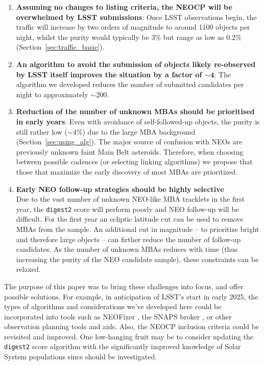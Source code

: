 \documentclass[twocolumn]{aastex631}
\newcommand{\dig}{\texttt{digest2}}
\newcommand{\npernightAlg}{200}
\newcommand{\purityAlg}{4}
\begin{document}
\begin{enumerate}
    \item \textbf{Assuming no changes to listing criteria, the NEOCP will be overwhelmed by LSST submissions}: Once LSST observations begin, the traffic will increase by two orders of magnitude to around 1100 objects per night, whilst the purity would typically be 3\% but range as low as 0.2\% (Section~\ref{sec:traffic_basic}).
    \item \textbf{An algorithm to avoid the submission of objects likely re-observed by LSST itself improves the situation by a factor of $\mathbf{\sim4}$}: The algorithm we developed reduces the number of submitted candidates per night to approximately ${\sim}\npernightAlg{}$.
    \item \textbf{Reduction of the number of unknown MBAs should be prioritised in early years}: Even with avoidance of self-followed-up objects, the purity is still rather low (${\sim}\purityAlg{}\%$) due to the large MBA background (Section~\ref{sec:using_alg}).
    The major source of confusion with NEOs are previously unknown faint Main Belt asteroids. Therefore, when choosing between possible cadences (or selecting linking algorithms) we propose that those that maximize the early discovery of most MBAs are prioritized.
    \item \textbf{Early NEO follow-up strategies should be highly selective}\\Due to the vast number of unknown NEO-like MBA tracklets in the first year, the \dig{} score will perform poorly and NEO follow-up will be difficult. For the first year an ecliptic latitude cut can be used to remove MBAs from the sample. An additional cut in magnitude -- to prioritize bright and therefore large objects -- can firther reduce the number of follow-up candidates. As the number of unknown MBAs reduces with time (thus increasing the purity of the NEO candidate sample), these constraints can be relaxed.
\end{enumerate}

The purpose of this paper was to bring these challenges into focus, and offer possible solutions. For example, in anticipation of LSST's start in early 2025, the types of algorithms and considerations we've developed here could be incorporated into tools such as NEOFixer \citep{NEOfixer}, the SNAPS broker \citep{SNAPS}, or other observation planning tools and aids. Also, the NEOCP inclusion criteria could be revisited and improved. One low-hanging fruit may be to consider updating the \dig{} score algorithm with the significantly improved knowledge of Solar System populations since \citet{Keys+2019} should be investigated.
\\
\end{document}
